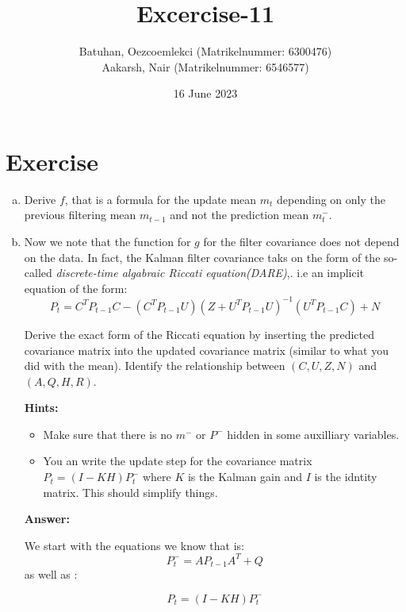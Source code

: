 \documentclass{tufte-handout}
\title{Excercise-11}
\author{Batuhan, Oezcoemlekci (Matrikelnummer: 6300476) \\
         Aakarsh, Nair (Matrikelnummer: 6546577)}
\date{16 June 2023}
\begin{document}
\maketitle%

\section{Exercise}

\begin{enumerate}[(a)]
    \item Derive $f$, that is a formula for the update mean $m_t$ depending on only the previous filtering mean $m_{t-1}$ and not the prediction mean $m_t^{-}$.
    
    \item Now we note that the function for $g$  for the filter covariance does not depend on the data. In fact, the Kalman filter covariance taks on the form of the so-called \emph{discrete-time algabraic Riccati equation(DARE)},. i.e an implicit equation of the form: 
    \begin{equation*}
        P_t = C^TP_{t-1}C - (C^T P_{t-1}U)(Z + U^TP_{t-1}U)^{-1}(U^TP_{t-1}C) + N
    \end{equation*}

    Derive the exact form of the Riccati equation by inserting the 
    predicted covariance matrix into the updated covariance matrix (similar to what you did with the mean). Identify the relationship
    between $(C, U, Z, N)$ and $(A, Q, H, R)$.

    
    \textbf{Hints:}
    \begin{itemize}
        \item Make sure that there is no $m^{-}$  or $P^{-}$ hidden in some auxilliary variables.
        \item You an write the update step for the covariance matrix $P_t = (I  - KH)P_t^{-}$ where $K$ is the Kalman gain and $I$ is the  idntity matrix. This should simplify things.
    \end{itemize}

    \textbf{Answer:}

   We start with the equations we know that is:
   \begin{equation}
        P_t^{-} = AP_{t-1}A^T + Q
        \label{predict-step}
   \end{equation}
   as well as :
   
   \begin{equation}
      P_t  = (I  - KH)P_t^{-}
      \label{update-step}
   \end{equation}


\end{enumerate}
\end{document}
